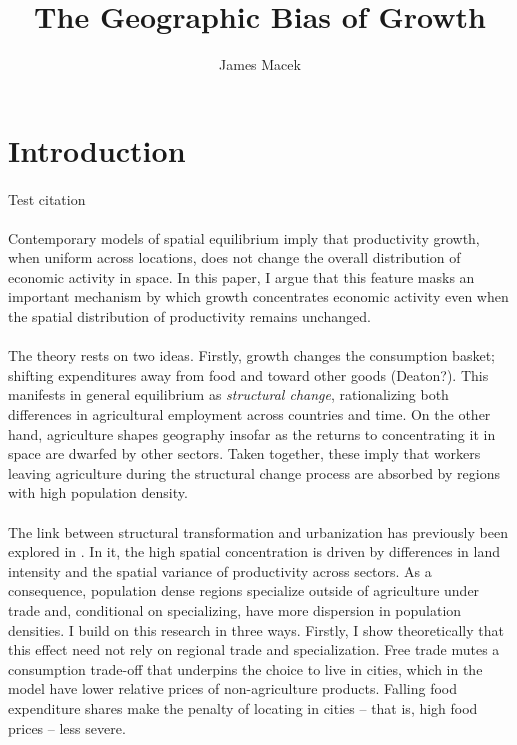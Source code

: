 \documentclass[]{article}
\title{The Geographic Bias of Growth}
\author{James Macek}
\begin{document}
\maketitle

\begin{abstract}


\end{abstract}

\section{Introduction}
\paragraph*{}
Test citation \citet*{urbstruct} \citet{tombezhu} \cite{hao2020} \citep{eckertpeters} \citet{delventhalglobenet}
\paragraph*{}
Contemporary models of spatial equilibrium imply that productivity growth, when uniform across locations, does not change the overall distribution of economic activity in space. In this paper, I argue that this
 feature masks an important mechanism by which growth concentrates economic activity even when the spatial distribution of productivity remains unchanged. 
\paragraph*{}
The theory rests on two ideas. Firstly, growth changes the consumption basket; shifting expenditures away from food and toward other goods (Deaton?). This manifests in general equilibrium as \textit{structural change}, rationalizing both differences in agricultural employment across countries and time. On the other hand, agriculture shapes geography insofar as the returns to concentrating it in space are dwarfed by other sectors. Taken together, these imply that workers leaving agriculture during the structural change process are absorbed by regions with high population density. 
\paragraph*{}
The link between structural transformation and urbanization has previously been explored in \citet{urbstruct}. In it, the high spatial concentration is driven by differences in land intensity and the spatial variance of productivity across sectors. As a consequence, population dense regions specialize outside of agriculture under trade and, conditional on specializing, have more dispersion in population densities. I build on this research in three ways. Firstly, I show theoretically that this effect need not rely on regional trade and specialization. Free trade mutes a consumption trade-off that underpins
 the choice to live in cities, which in the model have lower relative prices of non-agriculture products. Falling food expenditure shares make the penalty of locating in cities -- that is, high food prices -- less severe. 
\end{document}
